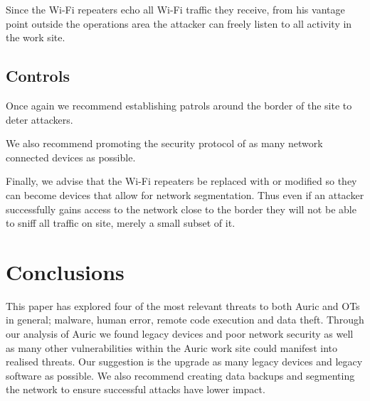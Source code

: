 \documentclass{article}
\begin{document}
\begin{multicols}{2}
    Since the Wi-Fi repeaters echo all Wi-Fi traffic they receive,
    from his vantage point outside the operations area the attacker
    can freely listen to all activity in the work site.

    \subsection{Controls}
    Once again we recommend establishing patrols around the border of the site
    to deter attackers.

    We also recommend promoting the security protocol of as many network
    connected devices
    as possible.

    Finally, we advise that the Wi-Fi repeaters be replaced with
    or modified so they can become devices that
    allow for network segmentation. Thus even if an attacker successfully gains
    access to the network close to the border they will not be able to sniff
    all traffic on site, merely a small subset of it.

    \section{Conclusions}
    This paper has explored four of the most relevant threats to both Auric
    and OTs in general; malware, human error, remote code execution and
    data theft. Through our analysis of Auric we found
    legacy devices and poor network security as well as many other
    vulnerabilities within the Auric work site could manifest into
    realised threats.
    Our suggestion is the upgrade as many legacy devices and legacy software as
    possible. We also recommend creating data backups and
    segmenting the network to ensure successful
    attacks have lower impact.

    
    
\end{multicols}
\end{document}
